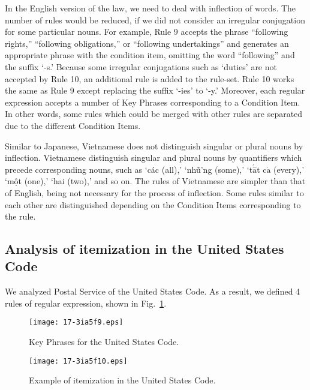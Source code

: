 \documentclass[english]{jnlp_1.4}
\begin{document}
In the English version of the law, we need to deal with inflection of
words.
The number of rules would be reduced,
if we did not consider an irregular conjugation for some particular nouns.
For example, Rule 9 accepts the phrase ``following rights,'' ``following 
obligations,'' or ``following undertakings'' and generates an
appropriate phrase with the condition item, omitting the word
``following'' and the suffix `-s.' 
Because some irregular conjugations such as `duties' are not accepted
by Rule 10, an additional rule is added to the rule-set.
Rule 10 works the same as Rule 9 except replacing the suffix `-ies' to 
`-y.'
Moreover, each regular expression accepts a number of Key Phrases 
corresponding to a Condition Item.
In other words, some rules which could be merged with other rules are
separated due to the different Condition Items.

Similar to Japanese, Vietnamese does not distinguish singular or plural
nouns by inflection.  
Vietnamese distinguish singular and plural nouns by quantifiers which
precede corresponding nouns, such as `c\'ac (all),' 
`nh\~u\hspace{-0.6mm}'ng (some),'
`t$\acute{\hat{\mbox{a}}}$t c$\acute{\mbox{a}}$ (every),'
`m\d{\^o}t (one),' 
`hai (two),' 
and so on.
The rules of Vietnamese are simpler than that of English, being not
necessary for the process of inflection.
Some rules similar to each other are distinguished depending on the
Condition Items corresponding to the rule.





\subsection{Analysis of itemization in the United States Code}

We analyzed Postal Service of the United States Code.
As a result, we defined 4 rules of regular expression, shown in
Fig.~\ref{fig:kp_us}.

\begin{figure}[b]
\begin{center}
\texttt{[image: 17-3ia5f9.eps]}
\end{center}
\caption{Key Phrases for the United States Code.}
\label{fig:kp_us}
\end{figure}
\begin{figure}[b]
\begin{center}
\texttt{[image: 17-3ia5f10.eps]}
\end{center}
\caption{Example of itemization in the United States Code.}
\label{fig:us_sample}
\end{figure}
\end{document}
